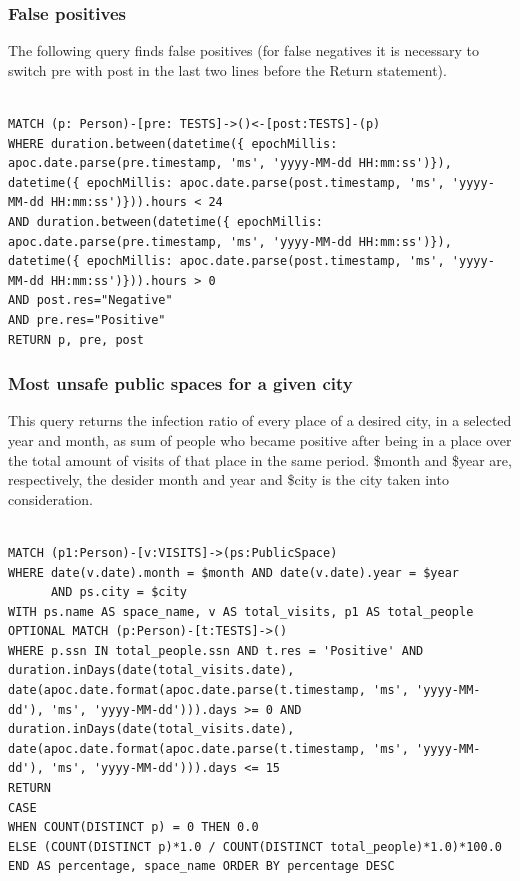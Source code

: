 \documentclass{article}
\begin{document}
\subsubsection{False positives}

The following query finds false positives (for false negatives it is necessary to switch pre with post in the last two lines before the Return statement).
\begin{lstlisting}[language=cypher, label=lst:cypher-example]

MATCH (p: Person)-[pre: TESTS]->()<-[post:TESTS]-(p)
WHERE duration.between(datetime({ epochMillis: apoc.date.parse(pre.timestamp, 'ms', 'yyyy-MM-dd HH:mm:ss')}), datetime({ epochMillis: apoc.date.parse(post.timestamp, 'ms', 'yyyy-MM-dd HH:mm:ss')})).hours < 24
AND duration.between(datetime({ epochMillis: apoc.date.parse(pre.timestamp, 'ms', 'yyyy-MM-dd HH:mm:ss')}), datetime({ epochMillis: apoc.date.parse(post.timestamp, 'ms', 'yyyy-MM-dd HH:mm:ss')})).hours > 0
AND post.res="Negative"
AND pre.res="Positive"
RETURN p, pre, post
\end{lstlisting}

\subsubsection{Most unsafe public spaces for a given city}
This query returns the infection ratio of every place of a desired city, in a selected year and month, as sum of people who became positive after being in a place over the total amount of visits of that place in the same period.
\$month and \$year are, respectively, the desider month and year and \$city is the city taken into consideration.
\begin{lstlisting}[language=cypher, label=lst:cypher-example]

MATCH (p1:Person)-[v:VISITS]->(ps:PublicSpace)
WHERE date(v.date).month = $month AND date(v.date).year = $year
      AND ps.city = $city
WITH ps.name AS space_name, v AS total_visits, p1 AS total_people
OPTIONAL MATCH (p:Person)-[t:TESTS]->()
WHERE p.ssn IN total_people.ssn AND t.res = 'Positive' AND duration.inDays(date(total_visits.date), date(apoc.date.format(apoc.date.parse(t.timestamp, 'ms', 'yyyy-MM-dd'), 'ms', 'yyyy-MM-dd'))).days >= 0 AND duration.inDays(date(total_visits.date), date(apoc.date.format(apoc.date.parse(t.timestamp, 'ms', 'yyyy-MM-dd'), 'ms', 'yyyy-MM-dd'))).days <= 15
RETURN
CASE
WHEN COUNT(DISTINCT p) = 0 THEN 0.0
ELSE (COUNT(DISTINCT p)*1.0 / COUNT(DISTINCT total_people)*1.0)*100.0
END AS percentage, space_name ORDER BY percentage DESC
\end{lstlisting}
\end{document}
